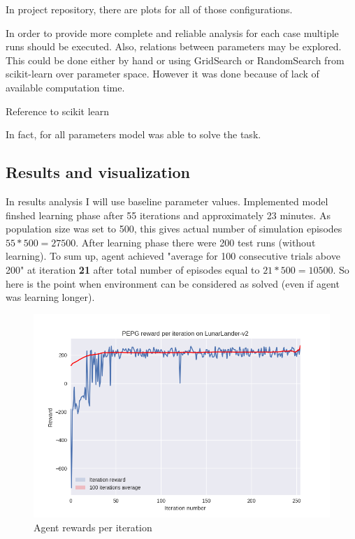 \documentclass[12pt]{article}
\begin{document}
In project repository, there are plots for all of those configurations.

In order to provide more complete and reliable analysis for each case multiple runs should be executed. Also, relations between parameters may be explored. This could be done either by hand or using GridSearch or RandomSearch from scikit-learn\cite{sklearn} over parameter space. However it was done because of lack of available computation time.

Reference to scikit learn

In fact, for all parameters model was able to solve the task.

\subsection{Results and visualization}

In results analysis I will use baseline parameter values. Implemented model finshed learning phase after 55 iterations and approximately 23 minutes. As population size was set to 500, this gives actual number of simulation episodes  $55 * 500 = 27500$. After learning phase there were 200 test runs (without learning). To sum up, agent achieved "average for 100 consecutive trials above 200" at iteration \textbf{21} after total number of episodes equal to $21 * 500 = 10500$. So here is the point when environment can be considered as solved (even if agent was learning longer).

\begin{figure}[h]
\centering
\includegraphics[scale=0.9]{final_plot.png} 
\caption{Agent rewards per iteration}
\end{figure}
\end{document}
